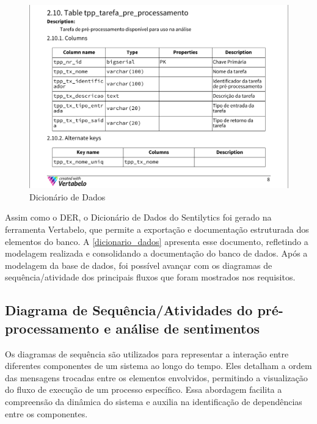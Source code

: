 \documentclass[
	12pt,				%
	oneside,			%
	a4paper,			%
	english,			%
	french,				%
	spanish,			%
	brazil				%
	]{abntex2}
\begin{document}
\begin{figure}[htbp]
\hypertarget{dicionario_dados}{%
\caption{Dicionário de Dados}\label{dicionario_dados}
\begin{center}
\includegraphics[scale=0.3]{imagens/sentilytics/diagramas/dicionario_dados.png}
\end{center}
}
\end{figure}

Assim como o DER, o Dicionário de Dados do Sentilytics foi gerado na
ferramenta Vertabelo, que permite a exportação e documentação
estruturada dos elementos do banco. A \autoref{dicionario_dados}
apresenta esse documento, refletindo a modelagem realizada e
consolidando a documentação do banco de dados. Após a modelagem da base
de dados, foi possível avançar com os diagramas de sequência/atividade
dos principais fluxos que foram mostrados nos requisitos.

\hypertarget{diagrama-de-sequuxeanciaatividades-do-pruxe9-processamento-e-anuxe1lise-de-sentimentos}{%
\subsection{Diagrama de Sequência/Atividades do pré-processamento e
análise de
sentimentos}\label{diagrama-de-sequuxeanciaatividades-do-pruxe9-processamento-e-anuxe1lise-de-sentimentos}}

Os diagramas de sequência são utilizados para representar a interação
entre diferentes componentes de um sistema ao longo do tempo. Eles
detalham a ordem das mensagens trocadas entre os elementos envolvidos,
permitindo a visualização do fluxo de execução de um processo
específico. Essa abordagem facilita a compreensão da dinâmica do sistema
e auxilia na identificação de dependências entre os componentes.
\end{document}
